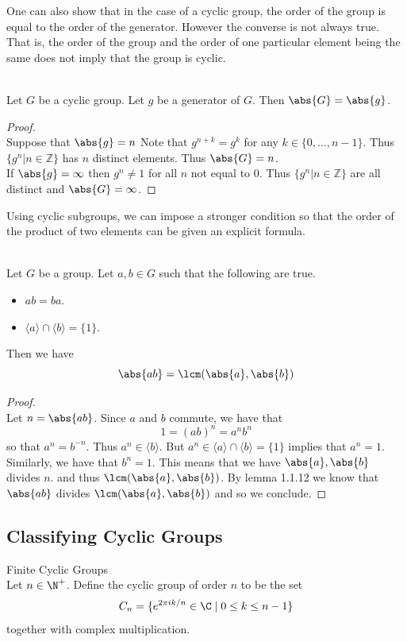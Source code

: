 \documentclass[a4paper]{article}
\begin{document}
One can also show that in the case of a cyclic group, the order of the group is equal to the order of the generator. However the converse is not always true. That is, the order of the group and the order of one particular element being the same does not imply that the group is cyclic. 

\begin{prp}{}{}\\
Let $G$ be a cyclic group. Let $g$ be a generator of $G$. Then $\abs{G}=\abs{g}$. 
\begin{proof}\\
Suppose that $\abs{g}=n$ Note that $g^{n+k}=g^k$ for any $k\in\{0,\dots,n-1\}$. Thus $\{g^n|n\in\mathbb{Z}\}$ has $n$ distinct elements. Thus $\abs{G}=n$. \\
If $\abs{g}=\infty$ then $g^n\neq 1$ for all $n$ not equal to $0$. Thus $\{g^n|n\in\mathbb{Z}\}$ are all distinct and $\abs{G}=\infty$.
\end{proof}
\end{prp}

Using cyclic subgroups, we can impose a stronger condition so that the order of the product of two elements can be given an explicit formula. 

\begin{prp}{}{}\\
Let $G$ be a group. Let $a,b\in G$ such that the following are true. 
\begin{itemize}
\item $ab=ba$. 
\item $\langle a\rangle\cap\langle b\rangle=\{1\}$. 
\end{itemize}
Then we have $$\abs{ab}=\lcm(\abs{a},\abs{b})$$ 
\begin{proof}\\
Let $n=\abs{ab}$. Since $a$ and $b$ commute, we have that $$1=(ab)^n=a^nb^n$$ so that $a^n=b^{-n}$. Thus $a^n\in\langle b\rangle$. But $a^n\in\langle a\rangle\cap\langle b\rangle=\{1\}$ implies that $a^n=1$. Similarly, we have that $b^n=1$. This means that we have $\abs{a},\abs{b}$ divides $n$. and thus $\lcm(\abs{a},\abs{b})$. By lemma 1.1.12 we know that $\abs{ab}$ divides $\lcm(\abs{a},\abs{b})$ and so we conclude. 
\end{proof}
\end{prp}

\subsection{Classifying Cyclic Groups}
\begin{defn}{Finite Cyclic Groups}{}\\
Let $n\in\N^+$. Define the cyclic group of order $n$ to be the set $$C_n=\{e^{2\pi i k/n}\in\C\;|\;0\leq k\leq n-1\}$$ together with complex multiplication. 
\end{defn}
\end{document}
